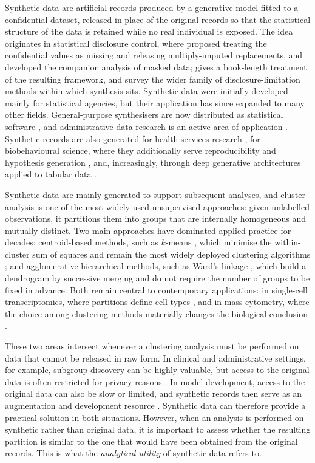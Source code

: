 \documentclass[pdflatex,referee]{sn-jnl}
\begin{document}
Synthetic data are artificial records produced by a generative model fitted to
a confidential dataset, released in place of the original records so that the
statistical structure of the data is retained while no real individual is
exposed. The idea originates in statistical disclosure control, where
\citet{rubin1993} proposed treating the confidential values as missing and
releasing multiply-imputed replacements, and \citet{little1993} developed the
companion analysis of masked data; \citet{drechsler2011} gives a book-length
treatment of the resulting framework, and \citet{matthews2011} survey the wider
family of disclosure-limitation methods within which synthesis sits. Synthetic
data were initially developed mainly for statistical agencies, but their
application has since expanded to many other fields. General-purpose
synthesisers are now distributed as statistical software
\citep{nowok2016,templ2017}, and administrative-data research is an active
area of application \citep{kokosi2022}. Synthetic records are also generated
for health services research \citep{gonzales2023,giuffre2023}, for
biobehavioural science, where they additionally serve reproducibility and
hypothesis generation \citep{quintana2020}, and, increasingly, through deep
generative architectures applied to tabular data \citep{goyal2024,zhao2024}.

Synthetic data are mainly generated to support subsequent analyses, and cluster
analysis is one of the most widely used unsupervised approaches: given
unlabelled observations, it partitions them into groups that are internally
homogeneous and mutually distinct. Two main approaches have dominated applied
practice for decades: centroid-based methods, such as $k$-means
\citep{macqueen1967,steinley2006}, which minimise the within-cluster sum of
squares and remain the most widely deployed clustering algorithms
\citep{ahmed2020}; and agglomerative hierarchical methods, such as Ward's
linkage \citep{ward1963}, which build a dendrogram by successive merging and
do not require the number of groups to be fixed in advance. Both remain
central to contemporary applications: in single-cell transcriptomics, where
partitions define cell types \citep{zappia2018}, and in mass cytometry, where
the choice among clustering methods materially changes the biological
conclusion \citep{liu2019}.

These two areas intersect whenever a clustering analysis must be performed on
data that cannot be released in raw form. In clinical and administrative
settings, for example, subgroup discovery can be highly valuable, but access
to the original data is often restricted for privacy reasons
\citep{goncalves2020,elemam2020,bhanot2021}. In model development, access to
the original data can also be slow or limited, and synthetic records then
serve as an augmentation and development resource \citep{rankin2020}.
Synthetic data can therefore provide a practical solution in both situations.
However, when an analysis is performed on synthetic rather than original data,
it is important to assess whether the resulting partition is similar to the
one that would have been obtained from the original records. This is what the
\emph{analytical utility} of synthetic data refers to.
\end{document}
